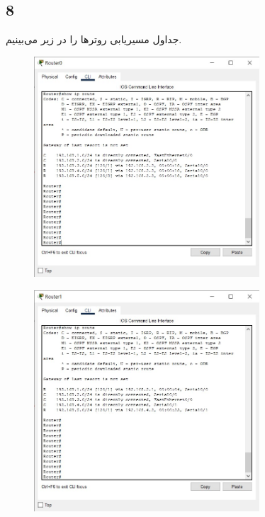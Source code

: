 \documentclass{article}
\begin{document}
\subsection{8}
جداول مسیریابی روترها را در زیر می‌بینیم.
\begin{figure}[H]
    \centering
    \includegraphics[width=0.75\textwidth]{figures/5.jpg}
    \caption{}
    \label{fig:fig1}
\end{figure}
\begin{figure}[H]
    \centering
    \includegraphics[width=0.75\textwidth]{figures/6.jpg}
    \caption{}
    \label{fig:fig1}
\end{figure}
\end{document}
